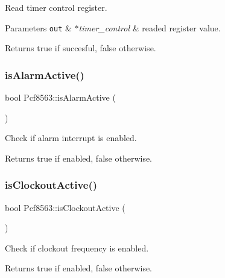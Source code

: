 Read timer control register. 


\begin{DoxyParams}[1]{Parameters}
\mbox{\tt out}  & {\em $\ast$timer\+\_\+control} & readed register value. \\
\hline
\end{DoxyParams}
\begin{DoxyReturn}{Returns}
true if succesful, false otherwise. 
\end{DoxyReturn}
\mbox{\label{namespacePcf8563_a23086671303b630318e82e9bef662b44}} 
\subsubsection{\texorpdfstring{is\+Alarm\+Active()}{isAlarmActive()}}
{\footnotesize\ttfamily bool Pcf8563\+::is\+Alarm\+Active (\begin{DoxyParamCaption}{ }\end{DoxyParamCaption})}



Check if alarm interrupt is enabled. 

\begin{DoxyReturn}{Returns}
true if enabled, false otherwise. 
\end{DoxyReturn}
\mbox{\label{namespacePcf8563_ab8ff6484e7a5636187e0212a98f623bf}} 
\subsubsection{\texorpdfstring{is\+Clockout\+Active()}{isClockoutActive()}}
{\footnotesize\ttfamily bool Pcf8563\+::is\+Clockout\+Active (\begin{DoxyParamCaption}{ }\end{DoxyParamCaption})}



Check if clockout frequency is enabled. 

\begin{DoxyReturn}{Returns}
true if enabled, false otherwise. 
\end{DoxyReturn}
\mbox{\label{namespacePcf8563_aab079fef811171abcba7e80b8595a8d1}} 
